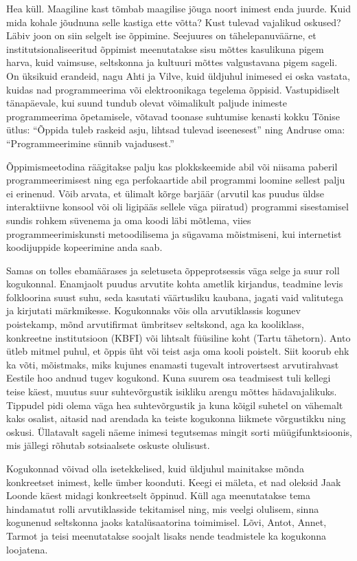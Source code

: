 Hea küll. Maagiline kast tõmbab maagilise jõuga noort inimest enda juurde. Kuid 
mida kohale jõudnuna selle kastiga ette võtta? Kust tulevad vajalikud 
oskused? Läbiv joon on siin selgelt ise õppimine. Seejuures on 
tähelepanuväärne, et institutsionaliseeritud õppimist meenutatakse sisu mõttes 
kasulikuna pigem harva, kuid vaimsuse, seltskonna ja kultuuri mõttes 
valgustavana pigem sageli. On üksikuid erandeid, nagu Ahti ja Vilve, kuid 
üldjuhul inimesed ei oska vastata, kuidas nad programmeerima või elektroonikaga 
tegelema õppisid. Vastupidiselt tänapäevale, kui suund tundub olevat võimalikult 
paljude inimeste programmeerima õpetamisele, võtavad toonase suhtumise 
kenasti kokku Tõnise ütlus: \enquote{Õppida tuleb raskeid asju, lihtsad 
tulevad iseenesest} ning Andruse oma: \enquote{Programmeerimine sünnib 
vajadusest.}

Õppimismeetodina räägitakse palju kas plokkskeemide abil või niisama paberil 
programmeerimisest ning ega perfokaartide abil programmi loomine sellest palju 
ei erinenud. Võib arvata, et ülimalt kõrge barjäär (arvutil kas puudus üldse 
interaktiivne konsool või oli ligipääs sellele väga piiratud) programmi 
sisestamisel sundis rohkem süvenema ja oma koodi läbi mõtlema, viies 
programmeerimiskunsti metoodilisema ja sügavama mõistmiseni, kui internetist 
koodijuppide kopeerimine anda saab.

Samas on tolles ebamäärases ja seletuseta õppeprotsessis väga selge ja suur 
roll kogukonnal. Enamjaolt puudus arvutite kohta ametlik kirjandus, teadmine 
levis folkloorina suust suhu, seda kasutati väärtusliku kaubana, jagati 
vaid valitutega ja kirjutati märkmikesse. Kogukonnaks võis olla 
arvutiklassis kogunev poistekamp, mõnd arvutifirmat ümbritsev seltskond, aga ka 
kooliklass, konkreetne institutsioon (KBFI) või lihtsalt füüsiline koht (Tartu 
tähetorn). Anto ütleb mitmel puhul, et õppis üht või teist asja oma kooli 
poistelt. Siit koorub ehk ka võti, mõistmaks, miks kujunes enamasti tugevalt 
introvertsest arvutirahvast Eestile hoo andnud tugev kogukond. Kuna suurem osa 
teadmisest tuli kellegi teise käest, muutus suur suhtevõrgustik isikliku arengu 
mõttes hädavajalikuks. Tippudel pidi olema väga hea suhtevõrgustik ja kuna 
kõigil suhetel on vähemalt kaks osalist, aitasid nad arendada ka teiste kogukonna 
liikmete võrgustikku ning oskusi. Üllatavalt sageli näeme inimesi tegutsemas 
mingit sorti müügifunktsioonis, mis jällegi rõhutab sotsiaalsete oskuste 
olulisust. 

Kogukonnad võivad olla isetekkelised, kuid üldjuhul mainitakse mõnda 
konkreetset inimest, kelle ümber koonduti. Keegi ei mäleta, et nad oleksid 
Jaak Loonde käest midagi konkreetselt õppinud. Küll 
aga meenutatakse tema hindamatut rolli arvutiklasside tekitamisel ning, mis 
veelgi olulisem, sinna kogunenud seltskonna jaoks katalüsaatorina toimimisel. 
Lõvi, Antot, Annet, Tarmot ja teisi meenutatakse soojalt lisaks 
nende teadmistele ka kogukonna loojatena. 

